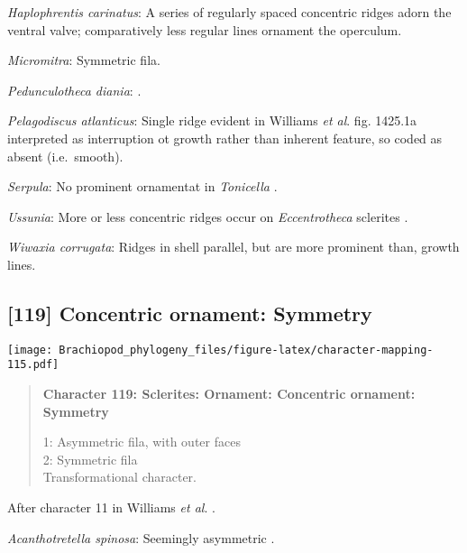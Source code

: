 \documentclass[openany]{book}
\theoremstyle{definition}
\theoremstyle{definition}
\theoremstyle{definition}
\theoremstyle{remark}
\begin{document}
\hypertarget{Haplophrentis_carinatus-coding-118}{}
\emph{Haplophrentis carinatus}: A series of regularly spaced concentric
ridges adorn the ventral valve; comparatively less regular lines
ornament the operculum.

\hypertarget{Micromitra-coding-118}{}
\emph{Micromitra}: Symmetric fila.

\hypertarget{Pedunculotheca_diania-coding-118}{}
\emph{Pedunculotheca diania}: \citet{Zhang2013}.

\hypertarget{Pelagodiscus_atlanticus-coding-118}{}
\emph{Pelagodiscus atlanticus}: Single ridge evident in Williams
\emph{et al}. \citeyearpar{Williams2006Rhynchonelliformeapart} fig.
1425.1a interpreted as interruption ot growth rather than inherent
feature, so coded as absent (i.e.~smooth).

\hypertarget{Serpula-coding-118}{}
\emph{Serpula}: No prominent ornamentat in \emph{Tonicella}
\citep{Connors2012}.

\hypertarget{Ussunia-coding-118}{}
\emph{Ussunia}: More or less concentric ridges occur on
\emph{Eccentrotheca} sclerites
\citep{Skovsted2011Scleritomeconstruction}.

\hypertarget{Wiwaxia_corrugata-coding-118}{}
\emph{Wiwaxia corrugata}: Ridges in shell parallel, but are more
prominent than, growth lines.

\subsection*{{[}119{]} Concentric ornament:
Symmetry}\label{concentric-ornament-symmetry}

\texttt{[image: Brachiopod\_phylogeny\_files/figure-latex/character-mapping-115.pdf]}

\begin{quote}
\textbf{Character 119: Sclerites: Ornament: Concentric ornament:
Symmetry}

1: Asymmetric fila, with outer faces\\
2: Symmetric fila\\
Transformational character.
\end{quote}

After character 11 in Williams \emph{et al}.
\citeyearpar{Williams1998Thediversity}.

\hypertarget{Acanthotretella_spinosa-coding-119}{}
\emph{Acanthotretella spinosa}: Seemingly asymmetric
\citetext{\citealp[fig.
122.3c]{Williams2000LinguliformeaCraniiformea}; \citealp[Fig.
1]{Zhang2011Anobolellate}}.
\end{document}
